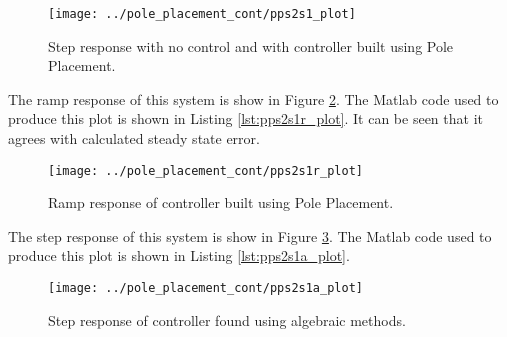 \documentclass{article}
\newcommand{\sincludepdf}[2][]{
	
}
\begin{document}
\begin{figure}[h!]
\begin{center}
\texttt{[image: ../pole\_placement\_cont/pps2s1\_plot]}
\end{center}
\caption{Step response with no control and with controller
built using Pole Placement.}
\label{fig:pps2s1_plot}
\end{figure}

\clearpage


\sincludepdf[pages={4}]{scan/11241301.pdf}

The ramp response of this system is show in Figure \ref{fig:pps2s1r_plot}.
The Matlab code used to produce this plot is shown
in Listing \ref{lst:pps2s1r_plot}.
It can be seen that it agrees with calculated steady state error.

\begin{figure}[h!]
\begin{center}
\texttt{[image: ../pole\_placement\_cont/pps2s1r\_plot]}
\end{center}
\caption{Ramp response of controller built using Pole Placement.}
\label{fig:pps2s1r_plot}
\end{figure}



\clearpage
\sincludepdf[pages={4},
			pagecommand=\subsection*{Example 2}
	]{scan/11231301.pdf}

The step response of this system is show in Figure \ref{fig:pps2s1a_plot}.
The Matlab code used to produce this plot is shown
in Listing \ref{lst:pps2s1a_plot}.

\begin{figure}[h!]
\begin{center}
\texttt{[image: ../pole\_placement\_cont/pps2s1a\_plot]}
\end{center}
\caption{Step response of controller found using algebraic methods.}
\label{fig:pps2s1a_plot}
\end{figure}


\end{document}
